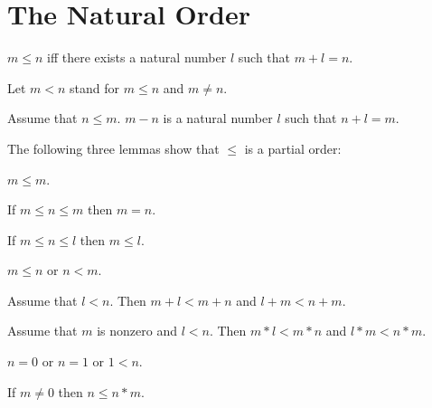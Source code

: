 \documentclass[11pt]{article}
\begin{document}
\section{The Natural Order}

\begin{forthel}

\begin{definition} $m \leq n$ iff 
there exists a natural number $l$ such that  
$m + l = n$.
\end{definition}

Let $m < n$ stand for $m \leq n$ and $m \neq n$.

\begin{definition} Assume that $n \leq m$.
$m - n$ is a natural number $l$ such that $n + l  = m$.
\end{definition}

\end{forthel}

The following three lemmas show that $\leq$ is a partial order:

\begin{forthel}

\begin{lemma} $m \leq m$.
\end{lemma}

\begin{lemma} If $m \leq n \leq m$ 
then $m = n$.
\end{lemma}

\begin{lemma} If $m \leq n \leq l$ 
then  $m \leq l$.
\end{lemma}

\begin{axiom} $m \leq n$ or $n < m$.
\end{axiom}

\begin{lemma} Assume that $l < n$.
  Then $m + l < m + n$ and $l + m < n + m$.
\end{lemma}

\begin{lemma} Assume that $m$ is nonzero and $l < n$.
  Then $m * l < m * n$ and $l * m < n * m$.
\end{lemma}

\begin{axiom} $n = 0$ or $n = 1$ or $1 < n$.
\end{axiom}

\begin{lemma} If $m \neq 0$ then $n \leq n * m$.
\end{lemma}
\end{forthel}
\end{document}
